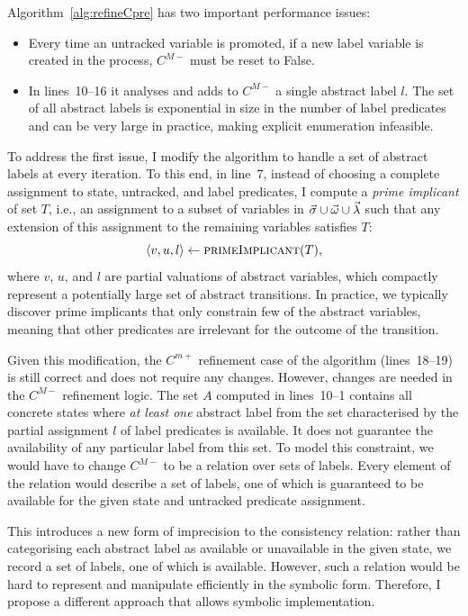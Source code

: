 Algorithm~\ref{alg:refineCpre} has two important performance issues: 

\begin{itemize}

    \item Every time an untracked variable is promoted, if a new label variable is created in the process, $C^{M-}$ must be reset to False.

    \item In lines~10--16 it analyses and adds to $C^{M-}$ a single abstract label $l$.  The set of all abstract labels is exponential in size in the number of label predicates and can be very large in practice, making explicit enumeration infeasible.  

\end{itemize}

To address the first issue, I modify the algorithm to handle a set of abstract labels at every iteration.  To this end, in line~7, instead of choosing a complete assignment to state, untracked, and label predicates, I compute a \emph{prime implicant} of set $T$, i.e., an assignment to a subset of variables in $\vec{\sigma}\cup\vec{\omega}\cup\vec{\lambda}$ such that any extension of this assignment to the remaining variables satisfies $T$: 
$$
\langle v,u,l\rangle \gets \textsc{primeImplicant}(T),
$$ 
where $v$, $u$, and $l$ are partial valuations of abstract variables, which compactly represent a potentially large set of abstract transitions.  In practice, we typically discover prime implicants that only constrain few of the abstract variables, meaning that other predicates are irrelevant for the outcome of the transition.  

Given this modification, the $C^{m+}$ refinement case of the algorithm (lines~18--19) is still correct and does not require any changes.  However, changes are needed in the $C^{M-}$ refinement logic.  The set $A$ computed in lines~10--1 contains all concrete states where \emph{at least one} abstract label from the set characterised by the partial assignment $l$ of label predicates is available.  It does not guarantee the availability of any particular label from this set.  To model this constraint, we would have to change $C^{M-}$ to be a relation over sets of labels.  Every element of the relation would describe a set of labels, one of which is guaranteed to be available for the given state and untracked predicate assignment.  

This introduces a new form of imprecision to the consistency relation: rather than categorising each abstract label as available or unavailable in the given state, we record a set of labels, one of which is available.  However, such a relation would be hard to represent and manipulate efficiently in the symbolic form.  Therefore, I propose a different approach that allows symbolic implementation.  

